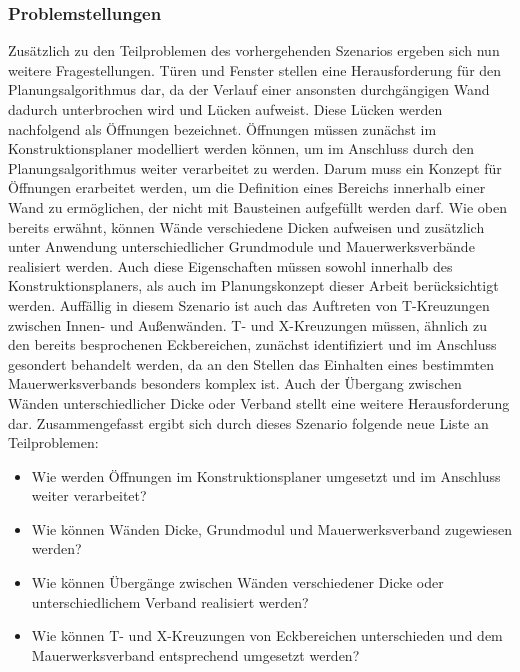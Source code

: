 \subsubsection*{Problemstellungen}
Zusätzlich zu den Teilproblemen des vorhergehenden Szenarios ergeben sich nun weitere Fragestellungen.
Türen und Fenster stellen eine Herausforderung für den Planungsalgorithmus dar, da der Verlauf einer ansonsten durchgängigen Wand dadurch unterbrochen wird und Lücken aufweist.
Diese \glqq{}Lücken\grqq{} werden nachfolgend als Öffnungen bezeichnet.
Öffnungen müssen zunächst im Konstruktionsplaner modelliert werden können, um im Anschluss durch den Planungsalgorithmus weiter verarbeitet zu werden.
Darum muss ein Konzept für Öffnungen erarbeitet werden, um die Definition eines Bereichs innerhalb einer Wand zu ermöglichen, der nicht mit Bausteinen aufgefüllt werden darf.
Wie oben bereits erwähnt, können Wände verschiedene Dicken aufweisen und zusätzlich unter Anwendung unterschiedlicher Grundmodule und Mauerwerksverbände realisiert werden.
Auch diese Eigenschaften müssen sowohl innerhalb des Konstruktionsplaners, als auch im Planungskonzept dieser Arbeit berücksichtigt werden.
Auffällig in diesem Szenario ist auch das Auftreten von T-Kreuzungen zwischen Innen- und Außenwänden.
T- und X-Kreuzungen müssen, ähnlich zu den bereits besprochenen Eckbereichen, zunächst identifiziert und im Anschluss gesondert behandelt werden, da an den Stellen das Einhalten eines bestimmten Mauerwerksverbands besonders komplex ist.
Auch der Übergang zwischen Wänden unterschiedlicher Dicke oder Verband stellt eine weitere Herausforderung dar.
Zusammengefasst ergibt sich durch dieses Szenario folgende neue Liste an Teilproblemen:
\begin{itemize}
  \item Wie werden Öffnungen im Konstruktionsplaner umgesetzt und im Anschluss weiter verarbeitet?
  \item Wie können Wänden Dicke, Grundmodul und Mauerwerksverband zugewiesen werden?
  \item Wie können Übergänge zwischen Wänden verschiedener Dicke oder unterschiedlichem Verband realisiert werden?
  \item Wie können T- und X-Kreuzungen von Eckbereichen unterschieden und dem Mauerwerksverband entsprechend umgesetzt werden? 
\end{itemize}

